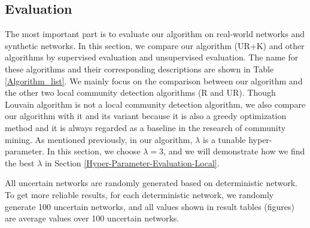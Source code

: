 \documentclass[\main/thesis.tex]{subfiles}
\begin{document}
\subsection{Evaluation}
The most important part is to evaluate our algorithm on real-world networks and synthetic networks. In this section, we compare our algorithm (UR+K) and other algorithms by supervised evaluation and unsupervised evaluation. The name for these algorithms and their corresponding descriptions are shown in Table \ref{Algorithm_list}. We mainly focus on the comparison between our algorithm and the other two local community detection algorithms (R and UR). Though Louvain algorithm is not a local community detection algorithm, we also compare our algorithm with it and its variant because it is also a greedy optimization method and it is always regarded as a baseline in the research of community mining. As mentioned previously, in our algorithm, $\lambda$ is a tunable hyper-parameter. In this section, we choose $\lambda=3$, and we will demonstrate how we find the best $\lambda$ in Section \ref{Hyper-Parameter-Evaluation-Local}.

All uncertain networks are randomly generated based on deterministic network. To get more reliable results, for each deterministic network, we randomly generate 100 uncertain networks, and all values shown in result tables (figures) are average values over 100 uncertain networks.
\end{document}

